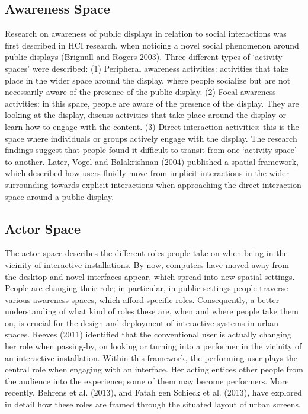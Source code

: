 
\subsection* {Awareness Space}
Research on awareness of public displays in relation to social interactions was first described in HCI research, when noticing a novel social phenomenon around public displays (Brignull and Rogers 2003). 
Three different types of ‘activity spaces’ were described: (1) Peripheral awareness activities: activities that take place in the wider space around the display, where people socialize but are not necessarily aware of the presence of the public display. (2) Focal awareness activities: in this space, people are aware of the presence of the display. 
They are looking at the display, discuss activities that take place around the display or learn how to engage with the content. (3) Direct interaction activities: this is the space where individuals or groups actively engage with the display. The research findings suggest that
people found it difficult to transit from one ‘activity space’ to another.
Later, Vogel and Balakrishnan (2004) published a spatial framework, which
described how users fluidly move from implicit interactions in the wider surrounding
towards explicit interactions when approaching the direct interaction space
around a public display.

\subsection* {Actor Space}
The actor space describes the different roles people take on when being in the vicinity of interactive installations. 
By now, computers have moved away from the desktop and novel interfaces appear, which spread into new spatial settings.
People are changing their role; in particular, in public settings people traverse various awareness spaces, which afford specific roles. 
Consequently, a better understanding of what kind of roles these are, when and where people take them on, is crucial for the design and deployment of interactive systems in urban spaces.
Reeves (2011) identified that the conventional user is actually changing her role when passing-by, on looking or turning into a performer in the vicinity of an interactive installation. 
Within this framework, the performing user plays the central role when engaging with an interface. 
Her acting entices other people from the audience into the experience; some of them may become performers. 
More recently, Behrens et al. (2013), and Fatah gen Schieck et al. (2013), have explored in detail how these roles are framed through the situated layout of urban screens.

